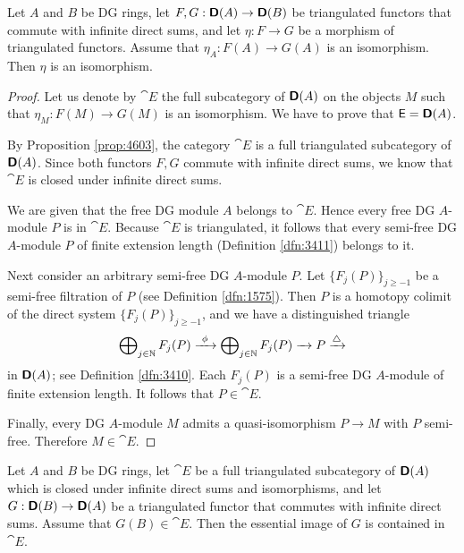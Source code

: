 \begin{lem} \label{lem:3435}
Let $A$ and $B$ be DG rings, let 
$F, G : \boldsymbol{\mathsf{D}}(A) \to \boldsymbol{\mathsf{D}}(B)$ be
triangulated functors that commute with infinite direct sums,
and let $\eta : F \to G$ be a morphism of triangulated functors. Assume that
$\eta_A: F(A) \to G(A)$ is an isomorphism. Then $\eta$ is an isomorphism. 
\end{lem}

\begin{proof}
Let us denote by $\cat{E}$ the full subcategory of $\boldsymbol{\mathsf{D}}(A)$ on the objects 
$M$ such that $\eta_M: F(M) \to G(M)$ is an isomorphism. We have to prove that 
$\operatorname{\mathsf{E}} = \boldsymbol{\mathsf{D}}(A)$. 

By Proposition \ref{prop:4603}, 
the category $\cat{E}$ is a full triangulated subcategory of $\boldsymbol{\mathsf{D}}(A)$.
Since both functors $F, G$ commute with infinite direct sums,
we know that $\cat{E}$ is closed under infinite direct sums.

We are given that the free DG module $A$ belongs to $\cat{E}$.
Hence every free DG $A$-module $P$ is in $\cat{E}$.
Because $\cat{E}$ is triangulated, it follows that every semi-free DG 
$A$-module $P$ of finite extension length (Definition \ref{dfn:3411}) belongs 
to 
it. 

Next consider an arbitrary semi-free DG $A$-module $P$.
Let $\{ F_j(P) \}_{j \geq -1}$ be a semi-free filtration of $P$
(see Definition \ref{dfn:1575}). 
Then $P$ is a homotopy colimit of the direct system 
$\{ F_j(P) \}_{j \geq -1}$, and we have a distinguished triangle 
\begin{equation} \label{eqn:3440}
\bigoplus\nolimits_{j \in \mathbb{N}} F_j(P) \xrightarrow{\ \phi \ } 
\bigoplus\nolimits_{j \in \mathbb{N}} F_j(P) 
\xrightarrow{ \ \ } P \xrightarrow{\triangle}
\end{equation}
in $\boldsymbol{\mathsf{D}}(A)$; see Definition \ref{dfn:3410}. 
Each $F_j(P)$ is a semi-free DG $A$-module of finite extension length. It 
follows that $P \in \cat{E}$. 

Finally, every DG $A$-module $M$ admits a quasi-isomorphism 
$P \to M$ with $P$ semi-free. Therefore $M \in \cat{E}$.
\end{proof}

\begin{lem} \label{lem:3470}
Let $A$ and $B$ be DG rings, let $\cat{E}$ be a full triangulated 
subcategory of $\boldsymbol{\mathsf{D}}(A)$ which is closed under infinite direct sums
and isomorphisms, and let $G : \boldsymbol{\mathsf{D}}(B) \to \boldsymbol{\mathsf{D}}(A)$ be a
triangulated functor that commutes with infinite direct sums.
Assume that $G(B) \in \cat{E}$. Then the essential image of $G$ is contained 
in $\cat{E}$. 
\end{lem}


